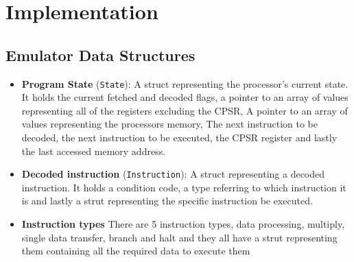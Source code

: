 \documentclass[8pt]{article}
\begin{document}
\section{Implementation}

\subsection{Emulator Data Structures}

\begin{itemize}

    \item \textbf{Program State} (\texttt{State}): A struct representing the 
    processor's current state. It holds the current fetched and 
    decoded flags, a pointer to an array of values representing 
    all of the registers excluding the CPSR, A pointer to an array of values 
    representing the processors memory, The next instruction to be decoded, the 
    next instruction to be executed, 
    the CPSR register and lastly the last accessed memory address.
    
    \item \textbf{Decoded instruction} (\texttt{Instruction}): A struct representing
    a decoded instruction. It holds a condition code, a type referring to which 
    instruction it is and lastly a strut representing the specific instruction be executed.
    
    \item \textbf{Instruction types} There are 5 instruction types, data processing,
    multiply, single data transfer, branch and halt and they all have a strut
    representing them containing all the required data to execute them

    
    \end{itemize}
\end{document}
